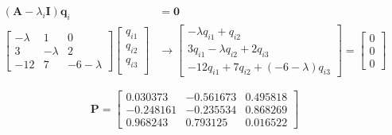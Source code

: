 \begin{align*}
 (\mathbf{A} - \lambda_i \mathbf{I})\mathbf{q}_ i &= \mathbf{0}\\
 \begin{bmatrix}
  -\lambda & 1 & 0\\
  3 & -\lambda & 2\\
  -12 & 7 & -6-\lambda
 \end{bmatrix}
 \begin{bmatrix}
  q_{i1}\\ q_{i2}\\q_{i3}\\
 \end{bmatrix}
 & \rightarrow
 \begin{bmatrix}
  -\lambda q_{i1} + q_{i2} \\
  3q_{i1} - \lambda q_{i2} + 2q_{i3}\\
  -12 q_{i1} + 7 q_{i2} + (-6 -\lambda ) q_{i3}
 \end{bmatrix}
 = \begin{bmatrix}
    0\\0\\0
   \end{bmatrix}
\end{align*}


\begin{equation*}
 \mathbf{P} = \begin{bmatrix}
                0.030373 &  -0.561673  & 0.495818\\
                -0.248161 & -0.235534 &  0.868269\\
                0.968243 &  0.793125 &  0.016522
              \end{bmatrix}
\end{equation*}
